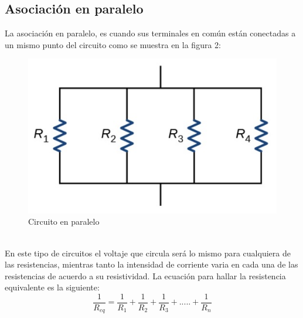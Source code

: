 \subsection{Asociación en paralelo}
La asociación en paralelo, es cuando sus terminales en común están conectadas a un mismo punto del circuito como se muestra en la figura 2:\\
\begin{figure}[h]
	\centering
	\includegraphics{imagenes/paralelo}
	\caption{Circuito en paralelo}
\end{figure}\\
En este tipo de circuitos el voltaje que circula será lo mismo para cualquiera de las resistencias, mientras tanto la intensidad de corriente varia en cada una de las resistencias de acuerdo a su resistividad. La ecuación para hallar la resistencia equivalente es la siguiente:
\begin{equation*}
	\dfrac{1}{R_{eq}} = \dfrac{1}{R_{1}} + \dfrac{1}{R_{2}} + \dfrac{1}{R_{3}} + ..... + \dfrac{1}{R_{n}}
\end{equation*}
